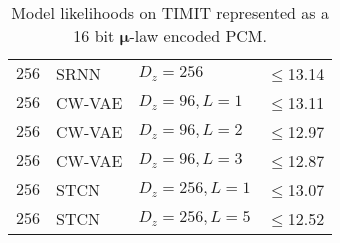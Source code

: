 {\begin{table}[p]
\begin{tabular}{ll|lr}
        $256$     & SRNN                & $D_z=256$             & $\leq$13.14 \\
        $256$     & CW-VAE              & $D_z=96, L=1$         & $\leq$13.11 \\
        $256$     & CW-VAE              & $D_z=96, L=2$         & $\leq$12.97 \\
        $256$     & CW-VAE              & $D_z=96, L=3$         & $\leq$12.87 \\
        $256$     & STCN                & $D_z=256,L=1$         & $\leq$13.07 \\  %
        $256$     & STCN                & $D_z=256,L=5$         & $\leq$12.52 \\
        \bottomrule
    \end{tabular}
    \vspace{2mm}
    \caption[Model likelihoods on TIMIT represented as a 16 bit $\boldsymbol{\mu}$-law PCM]{
    Model likelihoods on TIMIT represented as a 16 bit $\boldsymbol{\mu}$-law encoded PCM.
    }
    \label{tab: timit likelihoods dmol mu-law appendix}
\end{table}


}
